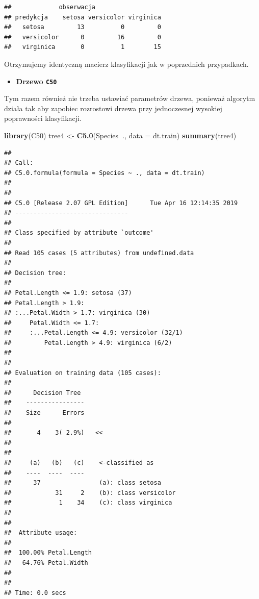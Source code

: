 \documentclass[]{book}
\newenvironment{Shaded}{\begin{snugshade}}{\end{snugshade}}
\newcommand{\DataTypeTok}[1]{\textcolor[rgb]{0.13,0.29,0.53}{#1}}
\newcommand{\KeywordTok}[1]{\textcolor[rgb]{0.13,0.29,0.53}{\textbf{#1}}}
\newcommand{\NormalTok}[1]{#1}
\newcommand{\OperatorTok}[1]{\textcolor[rgb]{0.81,0.36,0.00}{\textbf{#1}}}
\newcommand{\StringTok}[1]{\textcolor[rgb]{0.31,0.60,0.02}{#1}}
\providecommand{\tightlist}{%
  \setlength{\itemsep}{0pt}\setlength{\parskip}{0pt}}
\theoremstyle{plain}
\theoremstyle{definition}
\theoremstyle{definition}
\theoremstyle{definition}
\theoremstyle{definition}
\theoremstyle{remark}
\begin{document}
\begin{Shaded}
\end{Shaded}

\begin{verbatim}
##             obserwacja
## predykcja    setosa versicolor virginica
##   setosa         13          0         0
##   versicolor      0         16         0
##   virginica       0          1        15
\end{verbatim}

Otrzymujemy identyczną macierz klasyfikacji jak w poprzednich przypadkach.

\begin{itemize}
\tightlist
\item
  \textbf{Drzewo \texttt{C50}}
\end{itemize}

Tym razem również nie trzeba ustawiać parametrów drzewa, ponieważ algorytm działa tak aby zapobiec rozrostowi drzewa przy jednoczesnej wysokiej poprawności klasyfikacji.

\begin{Shaded}
\begin{Highlighting}[]
\KeywordTok{library}\NormalTok{(C50)}
\NormalTok{tree4 <-}\StringTok{ }\KeywordTok{C5.0}\NormalTok{(Species}\OperatorTok{~}\NormalTok{., }\DataTypeTok{data =}\NormalTok{ dt.train)}
\KeywordTok{summary}\NormalTok{(tree4)}
\end{Highlighting}
\end{Shaded}

\begin{verbatim}
## 
## Call:
## C5.0.formula(formula = Species ~ ., data = dt.train)
## 
## 
## C5.0 [Release 2.07 GPL Edition]      Tue Apr 16 12:14:35 2019
## -------------------------------
## 
## Class specified by attribute `outcome'
## 
## Read 105 cases (5 attributes) from undefined.data
## 
## Decision tree:
## 
## Petal.Length <= 1.9: setosa (37)
## Petal.Length > 1.9:
## :...Petal.Width > 1.7: virginica (30)
##     Petal.Width <= 1.7:
##     :...Petal.Length <= 4.9: versicolor (32/1)
##         Petal.Length > 4.9: virginica (6/2)
## 
## 
## Evaluation on training data (105 cases):
## 
##      Decision Tree   
##    ----------------  
##    Size      Errors  
## 
##       4    3( 2.9%)   <<
## 
## 
##     (a)   (b)   (c)    <-classified as
##    ----  ----  ----
##      37                (a): class setosa
##            31     2    (b): class versicolor
##             1    34    (c): class virginica
## 
## 
##  Attribute usage:
## 
##  100.00% Petal.Length
##   64.76% Petal.Width
## 
## 
## Time: 0.0 secs
\end{verbatim}
\end{document}

